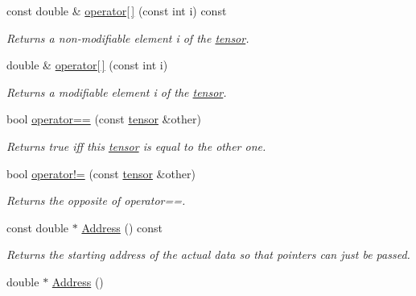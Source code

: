 \begin{DoxyCompactItemize}
const double \& \hyperlink{classJKBuilder_1_1tensor_a4f0dc1b84b580cec49500c70f87e084a}{operator\mbox{[}$\,$\mbox{]}} (const int i) const 
\begin{DoxyCompactList}\small\item\em Returns a non-\/modifiable element i of the \hyperlink{classJKBuilder_1_1tensor}{tensor}. \item\end{DoxyCompactList}\item 
double \& \hyperlink{classJKBuilder_1_1tensor_a38c9fed6b117f7cf8b76785648d76b62}{operator\mbox{[}$\,$\mbox{]}} (const int i)
\begin{DoxyCompactList}\small\item\em Returns a modifiable element i of the \hyperlink{classJKBuilder_1_1tensor}{tensor}. \item\end{DoxyCompactList}\item 
bool \hyperlink{classJKBuilder_1_1tensor_a10ae0b61e655854d12c6465d2b9e3506}{operator==} (const \hyperlink{classJKBuilder_1_1tensor}{tensor} \&other)
\begin{DoxyCompactList}\small\item\em Returns true iff this \hyperlink{classJKBuilder_1_1tensor}{tensor} is equal to the other one. \item\end{DoxyCompactList}\item 
bool \hyperlink{classJKBuilder_1_1tensor_a9b42dd835ddf2eb1a26b5d525b59b2b8}{operator!=} (const \hyperlink{classJKBuilder_1_1tensor}{tensor} \&other)
\begin{DoxyCompactList}\small\item\em Returns the opposite of operator==. \item\end{DoxyCompactList}\item 
const double $\ast$ \hyperlink{classJKBuilder_1_1tensor_a6a4e024f566d3bf9ba32a349afc5bbcf}{Address} () const 
\begin{DoxyCompactList}\small\item\em Returns the starting address of the actual data so that pointers can just be passed. \item\end{DoxyCompactList}\item 
double $\ast$ \hyperlink{classJKBuilder_1_1tensor_ac982d9eb84092bfc13694448dd824cbc}{Address} ()
\end{DoxyCompactItemize}
